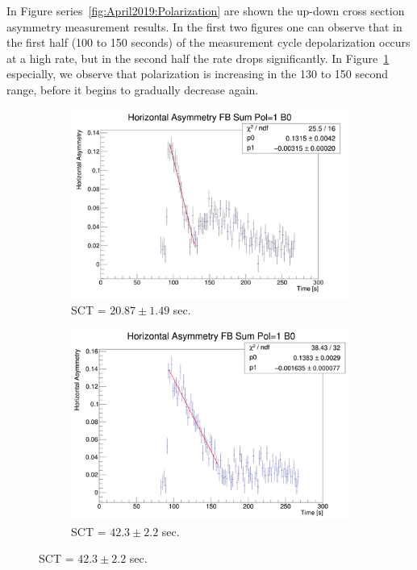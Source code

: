 In Figure series~\ref{fig:April2019:Polarization} are shown the up-down cross section asymmetry measurement 
results. In the first two figures one can observe that in the first half (100 to 150 seconds) of the measurement cycle depolarization occurs at a high rate, but in the second half the rate drops significantly.
In Figure~\ref{fig:Polariation:recovery-from-halo-to-core} especially, we observe that polarization is increasing in the 130 to 150 second range, before it begins to gradually decrease again.
\begin{figure}[h]\centering
	\begin{subfigure}{\linewidth}
		\includegraphics[height=.35\paperheight]{images/chapter4/SCT-April-2019/11th_19-55}
		\caption{SCT = $20.87 \pm 1.49$ sec.\label{fig:Polariation:recovery-from-halo-to-core}}
	\end{subfigure}
	\begin{subfigure}{\linewidth}
		\includegraphics[height=.35\paperheight]{images/chapter4/SCT-April-2019/11th_20-20}
		\caption{SCT = $42.3 \pm 2.2$ sec.}
	\end{subfigure}
\end{figure}
